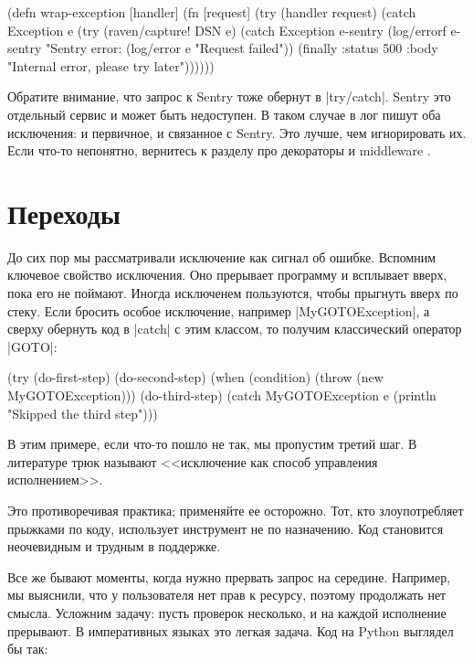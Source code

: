 \begin{english}
  \begin{clojure}
(defn wrap-exception
  [handler]
  (fn [request]
    (try
      (handler request)
      (catch Exception e
        (try
          (raven/capture! DSN e)
          (catch Exception e-sentry
            (log/errorf e-sentry "Sentry error: %
            (log/error e "Request failed"))
          (finally
            {:status 500
             :body "Internal error, please try later"}))))))
  \end{clojure}
\end{english}

Обратите внимание, что запрос к Sentry тоже обернут в \spverb|try/catch|. Sentry
это отдельный сервис и может быть недоступен. В таком случае в лог пишут оба
исключения: и первичное, и связанное с Sentry. Это лучше, чем игнорировать
их. Если что-то непонятно, вернитесь к разделу про декораторы и
middleware .

\section{Переходы}

До сих пор мы рассматривали исключение как сигнал об ошибке. Вспомним ключевое
свойство исключения. Оно прерывает программу и всплывает вверх, пока его не
поймают. Иногда исключенем пользуются, чтобы прыгнуть вверх по стеку. Если
бросить особое исключение, например \spverb|MyGOTOException|, а сверху обернуть
код в \spverb|catch| с этим классом, то получим классический оператор
\spverb|GOTO|:

\begin{english}
  \begin{clojure}
(try
  (do-first-step)
  (do-second-step)
  (when (condition)
    (throw (new MyGOTOException)))
  (do-third-step)
  (catch MyGOTOException e
    (println "Skipped the third step")))
  \end{clojure}
\end{english}

В этим примере, если что-то пошло не так, мы пропустим третий шаг. В литературе
трюк называют <<исключение как способ управления исполнением>>.

Это противоречивая практика; применяйте ее осторожно. Тот, кто злоупотребляет
прыжками по коду, использует инструмент не по назначению. Код становится
неочевидным и трудным в поддержке.

Все же бывают моменты, когда нужно прервать запрос на середине. Например, мы
выяснили, что у пользователя нет прав к ресурсу, поэтому продолжать нет
смысла. Усложним задачу: пусть проверок несколько, и на каждой исполнение
прерывают. В императивных языках это легкая задача. Код на Python выглядел бы
так:

